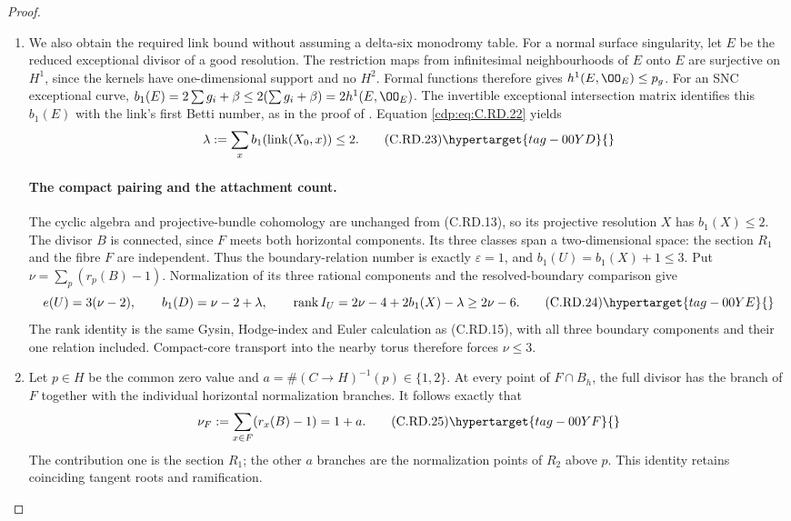 \begin{proof}
\begin{enumerate}[label={$\langle1\rangle$\arabic*.},leftmargin=*]
\item We also obtain the required link bound without
assuming a delta-six monodromy table. For a
normal surface singularity, let $E$ be the
reduced exceptional divisor of a good resolution.
The restriction maps from infinitesimal
neighbourhoods of $E$ onto $E$ are surjective
on $H^1$, since the kernels have one-dimensional
support and no $H^2$. Formal functions therefore
gives $h^1(E,\OO_E)\le p_g$.
For an SNC exceptional curve,
$b_1(E)=2\sum g_i+\beta\le
2(\sum g_i+\beta)=2h^1(E,\OO_E)$.
The invertible exceptional intersection matrix
identifies this $b_1(E)$ with the link's first
Betti number, as in the proof of .
Equation \eqref{cdp:eq:C.RD.22} yields
\[
              \lambda:=\sum_x b_1(\operatorname{link}(X_0,x))
                            \le2.
\tag{C.RD.23}\hypertarget{tag-00YD}{}\label{cdp:eq:C.RD.23}
\]

\paragraph{The compact pairing and the attachment count.}
The cyclic algebra and projective-bundle cohomology
are unchanged from (C.RD.13), so its projective
resolution $X$ has $b_1(X)\le2$.
The divisor $B$ is connected, since $F$ meets
both horizontal components. Its three classes
span a two-dimensional space: the section
$R_1$ and the fibre $F$ are independent.
Thus the boundary-relation number is exactly
$\varepsilon=1$, and $b_1(U)=b_1(X)+1\le3$.
Put $\nu=\sum_p(r_p(B)-1)$.
Normalization of its three rational components
and the resolved-boundary comparison give
\[
 e(U)=3(\nu-2),\qquad
 b_1(D)=\nu-2+\lambda,
 \qquad
 \operatorname{rank}I_U
       =2\nu-4+2b_1(X)-\lambda\ge2\nu-6.
\tag{C.RD.24}\hypertarget{tag-00YE}{}\label{cdp:eq:C.RD.24}
\]
The rank identity is the same Gysin, Hodge-index
and Euler calculation as (C.RD.15), with all
three boundary components and their one relation
included. Compact-core transport into the
nearby torus therefore forces $\nu\le3$.

\item Let $p\in H$ be the common zero value and
$a=\#(C\to H)^{-1}(p)\in\{1,2\}$.
At every point of $F\cap B_h$, the full divisor
has the branch of $F$ together with the
individual horizontal normalization branches.
It follows exactly that
\[
        \nu_F:=\sum_{x\in F}(r_x(B)-1)=1+a.
\tag{C.RD.25}\hypertarget{tag-00YF}{}\label{cdp:eq:C.RD.25}
\]
The contribution one is the section $R_1$;
the other $a$ branches are the normalization
points of $R_2$ above $p$. This identity retains
coinciding tangent roots and ramification.


\end{enumerate}
\end{proof}
